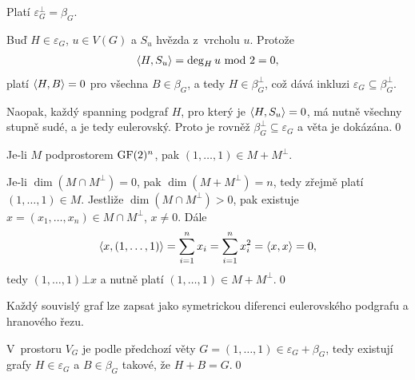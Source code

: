 \vt Platí $\varepsilon_G^\bot = \beta_G$.

\dk Buď $H \in \varepsilon_G$, $u \in V(G)$ a $S_u$ hvězda z~vrcholu $u$. Protože
\begin{align*}
{\langle H,S_u\rangle}= \deg_H u\text{ mod }2=0,
\end{align*}
platí ${\langle H,B\rangle} = 0$ pro všechna $B\in\beta_G$, a tedy $H \in \beta_G^\bot$, což dává inkluzi $\varepsilon_G \subseteq \beta_G^\bot$.

Naopak, každý spanning podgraf $H$, pro který je ${\langle H,S_u\rangle} = 0$, má nutně všechny stupně sudé, a je tedy eulerovský. Proto je rovněž $\beta_G^\bot \subseteq \varepsilon_G$ a věta je dokázána.\qed

\vt Je-li $M$ podprostorem $\mathrm{GF}(2)^n$, pak $(1,\dots,1) \in M + M^\bot$.

\dk Je-li $\dim(M \cap M^\bot) = 0$, pak $\dim(M + M^\bot) = n$, tedy zřejmě platí $(1,\dots,1)\in M$. Jestliže $\dim(M \cap M^\bot) > 0$, pak existuje $x=(x_1,\dots,x_n)\in M\cap M^\bot$, $x\neq0$. Dále
\begin{align}
{\langle x,(1,\dots,1)\rangle}=\sum_{i=1}^n x_i=\sum_{i=1}^n x_i^2={\langle x,x\rangle}=0,
\end{align}
tedy $(1,\dots,1)\bot x$ a nutně platí $(1,\dots,1)\in M + M^\bot$.\qed

\dsl Každý souvislý graf lze zapsat jako symetrickou diferenci eulerovského podgrafu a hranového řezu.

\dk V~prostoru $V_G$ je podle předchozí věty $G=(1,\dots,1)\in\varepsilon_G+\beta_G$, tedy existují grafy $H\in\varepsilon_G$ a $B\in\beta_G$ takové, že $H+B=G$.\qed